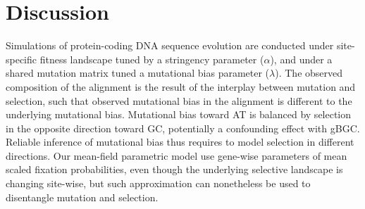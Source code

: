 \begin{table}[H]
    \centering
    \noindent{}
    \caption[Estimated parameters]{
    Nucleoprotein alignment of 498 amino acids available for 180 species (left column).
    Lactamase alignment of 263 amino acids available for 85 species (right column).
    }
    \label{table-mut-bias:estimation}
\end{table}


\section{Discussion}

Simulations of protein-coding DNA sequence evolution are conducted under site-specific fitness landscape tuned by a stringency parameter ($\alpha$), and under a shared mutation matrix tuned a mutational bias parameter ($\lambda$).
The observed composition of the alignment is the result of the interplay between mutation and selection, such that observed mutational bias in the alignment is different to the underlying mutational bias.
Mutational bias toward AT is balanced by selection in the opposite direction toward GC, potentially a confounding effect with gBGC.
Reliable inference of mutational bias thus requires to model selection in different directions.
Our mean-field parametric model use gene-wise parameters of mean scaled fixation probabilities, even though the underlying selective landscape is changing site-wise, but such approximation can nonetheless be used to disentangle mutation and selection.

